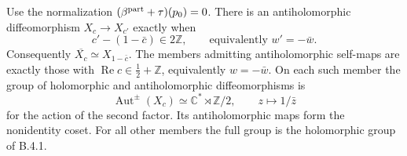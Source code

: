 \begin{proposition}\label{fam:src:B.4.2}\label{fam:st:B.4.2}
Use the normalization $(\beta^{\rm part}+\tau)(p_0)=0$. There is an antiholomorphic diffeomorphism $X_c\to X_{c'}$ exactly when
\[
 c'-(1-\bar c)\in2\mathbb Z,
 \qquad\text{equivalently }w'=-\bar w.
\]
Consequently $\overline{X_c}\simeq X_{1-\bar c}$. The members admitting antiholomorphic self-maps are exactly those with $\operatorname{Re}c\in\tfrac12+\mathbb Z$, equivalently $w=-\bar w$. On each such member the group of holomorphic and antiholomorphic diffeomorphisms is
\[
 \operatorname{Aut}^{\pm}(X_c)\simeq\mathbb C^*\rtimes\mathbb Z/2,
 \qquad z\longmapsto1/\bar z
\]
for the action of the second factor. Its antiholomorphic maps form the nonidentity coset. For all other members the full group is the holomorphic group of B.4.1.
\end{proposition}
